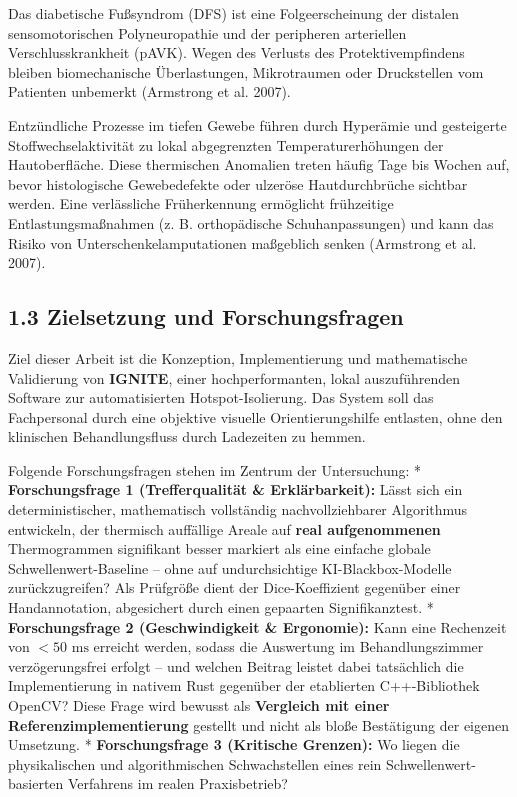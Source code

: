 \documentclass[
  11pt,
]{article}
\begin{document}
Das diabetische Fußsyndrom (DFS) ist eine Folgeerscheinung der distalen
sensomotorischen Polyneuropathie und der peripheren arteriellen
Verschlusskrankheit (pAVK). Wegen des Verlusts des Protektivempfindens
bleiben biomechanische Überlastungen, Mikrotraumen oder Druckstellen vom
Patienten unbemerkt (Armstrong et al. 2007).

Entzündliche Prozesse im tiefen Gewebe führen durch Hyperämie und
gesteigerte Stoffwechselaktivität zu lokal abgegrenzten
Temperaturerhöhungen der Hautoberfläche. Diese thermischen Anomalien
treten häufig Tage bis Wochen auf, bevor histologische Gewebedefekte
oder ulzeröse Hautdurchbrüche sichtbar werden. Eine verlässliche
Früherkennung ermöglicht frühzeitige Entlastungsmaßnahmen (z. B.
orthopädische Schuhanpassungen) und kann das Risiko von
Unterschenkelamputationen maßgeblich senken (Armstrong et al. 2007).

\subsection{1.3 Zielsetzung und
Forschungsfragen}\label{zielsetzung-und-forschungsfragen}

Ziel dieser Arbeit ist die Konzeption, Implementierung und mathematische
Validierung von \textbf{IGNITE}, einer hochperformanten, lokal
auszuführenden Software zur automatisierten Hotspot-Isolierung. Das
System soll das Fachpersonal durch eine objektive visuelle
Orientierungshilfe entlasten, ohne den klinischen Behandlungsfluss durch
Ladezeiten zu hemmen.

Folgende Forschungsfragen stehen im Zentrum der Untersuchung: *
\textbf{Forschungsfrage 1 (Trefferqualität \& Erklärbarkeit):} Lässt
sich ein deterministischer, mathematisch vollständig nachvollziehbarer
Algorithmus entwickeln, der thermisch auffällige Areale auf \textbf{real
aufgenommenen} Thermogrammen signifikant besser markiert als eine
einfache globale Schwellenwert-Baseline -- ohne auf undurchsichtige
KI-Blackbox-Modelle zurückzugreifen? Als Prüfgröße dient der
Dice-Koeffizient gegenüber einer Handannotation, abgesichert durch einen
gepaarten Signifikanztest. * \textbf{Forschungsfrage 2 (Geschwindigkeit
\& Ergonomie):} Kann eine Rechenzeit von \(< 50\text{ ms}\) erreicht
werden, sodass die Auswertung im Behandlungszimmer verzögerungsfrei
erfolgt -- und welchen Beitrag leistet dabei tatsächlich die
Implementierung in nativem Rust gegenüber der etablierten C++-Bibliothek
OpenCV? Diese Frage wird bewusst als \textbf{Vergleich mit einer
Referenzimplementierung} gestellt und nicht als bloße Bestätigung der
eigenen Umsetzung. * \textbf{Forschungsfrage 3 (Kritische Grenzen):} Wo
liegen die physikalischen und algorithmischen Schwachstellen eines rein
Schwellenwert-basierten Verfahrens im realen Praxisbetrieb?
\end{document}
